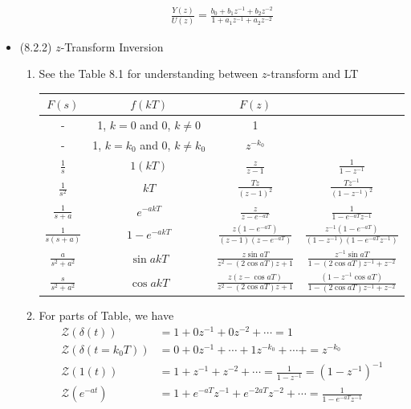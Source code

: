 \documentclass[landscape,14pt]{oblivoir}
\begin{document}
\begin{itemize}
\begin{enumerate}
\begin{align*}
			\frac{Y(z)}{U(z)} = \frac{b_0 + b_1 z^{-1} + b_2 z^{-2}}{1 + a_1 z^{-1} + a_2 z^{-2}} 
		\end{align*}
	\end{enumerate}
%
\newpage
%
	\item (8.2.2) $z$-Transform Inversion
	\begin{enumerate}
		\item See the Table 8.1 for understanding between $z$-transform and LT
		\begin{table}[h]
			\begin{tabular}{c||c||c|c} 
				\hline \hline 
				$F(s)$ & $f(kT)$ & $F(z)$ & \\ \hline
				- & 1, $k=0$ and 0, $k \neq 0$ & 1 & \\
				- & 1, $k=k_0$ and 0, $k \neq k_0$ & $z^{-k_0}$ & \\
				$\frac{1}{s}$ & $1(kT)$ & $\frac{z}{z-1}$ & $\frac{1}{1-z^{-1}}$ \\
				$\frac{1}{s^2}$ & $kT$ & $\frac{Tz}{(z-1)^2}$ & $\frac{Tz^{-1}}{(1-z^{-1})^2} $ \\
				$\frac{1}{s+a}$ & $e^{-akT}$ & $\frac{z}{z-e^{-aT}}$ & $\frac{1}{1-e^{-aT}z^{-1}}$ \\
				$\frac{1}{s(s+a)}$ & $1-e^{-akT}$ & $\frac{z(1-e^{-aT})}{(z-1)(z-e^{-aT})}$ & $\frac{z^{-1}(1-e^{-aT})}{(1-z^{-1})(1-e^{-aT} z^{-1})}$ \\
				$\frac{a}{s^2+a^2}$ & $\sin a kT$ & $\frac{z \sin aT}{z^2-(2\cos aT)z +1}$ & $\frac{z^{-1}  \sin aT}{1-(2\cos aT)z^{-1} + z^{-2}}$ \\
				$\frac{s}{s^2+a^2}$ & $\cos a kT$ & $\frac{z(z- \cos aT)}{z^2-(2\cos aT)z +1}$ & $\frac{(1- z^{-1}\cos aT )}{1-(2\cos aT)z^{-1} +z^{-2}}$ \\
				\hline \hline 
			\end{tabular}
		\end{table}
		\item For parts of Table, we have
		\begin{align*}
			\mathcal{Z}(\delta(t)) &= 1  + 0 z^{-1} + 0 z^{-2} + \cdots = 1  \\  
			\mathcal{Z}(\delta(t=k_0T)) &= 0  + 0 z^{-1} +  \cdots + 1 z^{-k_0} + \cdots +  = z^{-k_0}  \\  
			\mathcal{Z}(1(t)) &= 1 + z^{-1} + z^{-2} + \cdots = \frac{1}{1-z^{-1}} = (1-z^{-1})^{-1}  \\
			\mathcal{Z}(e^{-at}) &= 1 + e^{-aT} z^{-1} + e^{-2aT} z^{-2} + \cdots = \frac{1}{1-e^{-aT}z^{-1}} 
		\end{align*}

\end{enumerate}
\end{itemize}
\end{document}

